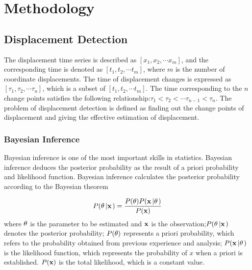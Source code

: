 \documentclass{svjour3}                     %
\begin{document}






\section{Methodology}
\label{method}





\subsection{Displacement Detection}
The displacement time series is described as $\left[ {{x_1},{x_2}, \cdots {x_m}} \right]$,  and the corresponding time is denoted as $\left[ {{t_1},{t_2}, \cdots {t_m}} \right]$, where $m$ is the number of coordinate displacements. The time of displacement changes is expressed as $\left[ {{\tau _1},{\tau _2}, \cdots {\tau _n}} \right]$, which is a subset of $\left[ {{t_1},{t_2}, \cdots {t_m}} \right]$.  
The time corresponding to the $n$ change points satisfies the following relationship:$ {{\tau _1}<{\tau _2}<\cdots {\tau _{n-1}}<{\tau _n}} $.
The problem of displacement detection is defined as finding out the change points of displacement and giving the effective estimation of displacement.

\subsubsection{Bayesian Inference}
Bayesian inference is one of the most important skills in statistics. Bayesian inference deduces the posterior probability as the result of a priori probability and likelihood function. Bayesian inference calculates the posterior probability according to the Bayesian theorem

\begin{equation}\label{eq_bayesian_inference}
P({\bf{\theta }}\left| {\bf{x}} \right.) = \frac{{P({\bf{\theta }})P({\bf{x}}\left| {\bf{\theta }} \right.)}}{{P({\bf{x}})}}
\end{equation}
where $\bf{\theta }$ is the parameter to be estimated and $\bf{x}$ is the observation;$P({\bf{\theta }}\left| {\bf{x}} \right.)$ denotes the posterior probability; $P({\bf{\theta }})$ represents a priori probability, which refers to the probability obtained from previous experience and analysis;
$P({\bf{x}}\left| {\bf{\theta }} \right.)$ is the likelihood function, which represents the probability of $x$ when a priori is established. ${P({\bf{x}})}$ is the total likelihood, which is a constant value.
\end{document}
